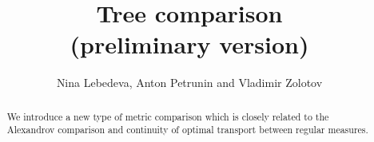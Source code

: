 \documentclass{article}
\begin{document}
\title{Tree comparison\\{\small(preliminary version)}}
\author{Nina Lebedeva, Anton Petrunin and Vladimir Zolotov}


\newcommand{\Addresses}{{\bigskip\footnotesize
Anton Petrunin, \par\nopagebreak\textsc{Department of Mathematics, PSU, University Park, PA 16802, USA}
\par\nopagebreak
\textit{Email}: \texttt{petrunin@math.psu.edu}

\medskip
 
...
}}


\date{}

\maketitle

\begin{abstract}
We introduce a new type of metric comparison which is closely related to the Alexandrov comparison and continuity of optimal transport between regular measures. 
\end{abstract}








\end{document}
